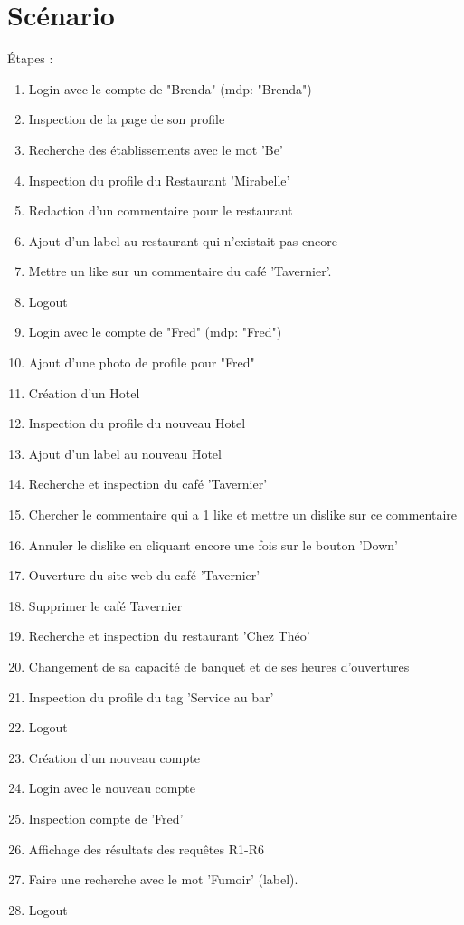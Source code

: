 \documentclass[11pt,a4paper]{report}
\begin{document}
\section*{Scénario}
Étapes :
\begin{enumerate}
\item Login avec le compte de "Brenda" (mdp: "Brenda")
\item Inspection de la page de son profile
\item Recherche des établissements avec le mot 'Be'
\item Inspection du profile du Restaurant 'Mirabelle'
\item Redaction d'un commentaire pour le restaurant
\item Ajout d'un label au restaurant qui n'existait pas encore
\item Mettre un like sur un commentaire du café 'Tavernier'.
\item Logout
\item Login avec le compte de "Fred" (mdp: "Fred")
\item Ajout d'une photo de profile pour "Fred"
\item Création d'un Hotel
\item Inspection du profile du nouveau Hotel
\item Ajout d'un label au nouveau Hotel
\item Recherche et inspection du café 'Tavernier'
\item Chercher le commentaire qui a 1 like et mettre un dislike sur ce commentaire
\item Annuler le dislike en cliquant encore une fois sur le bouton 'Down'
\item Ouverture du site web du café 'Tavernier'
\item Supprimer le café Tavernier
\item Recherche et inspection du restaurant 'Chez Théo'
\item Changement de sa capacité de banquet et de ses heures d'ouvertures
\item Inspection du profile du tag 'Service au bar'
\item Logout
\item Création d'un nouveau compte
\item Login avec le nouveau compte
\item Inspection compte de 'Fred' 
\item Affichage des résultats des requêtes R1-R6
\item Faire une recherche avec le mot 'Fumoir' (label).
\item Logout
\end{enumerate}
\end{document}
